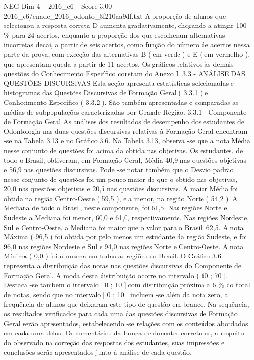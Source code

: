 \begin{textsample}{NEG Dim 4 – 2016\_c6 – Score 3.00 – 2016\_c6/enade\_2016\_odonto\_8f210aa9df.txt}
A proporção de alunos que selecionou a resposta correta D aumenta gradativamente, chegando a atingir 100 \% para 24 acertos, enquanto a proporção dos que escolheram alternativas incorretas decai, a partir de seis acertos, como função do número de acertos nessa parte da prova, com exceção das alternativas B ( em verde ) e E ( em vermelho ), que apresentam queda a partir de 11 acertos.
Os gráficos relativos às demais questões do Conhecimento Específico constam do Anexo I. 3.3 - ANÁLISE DAS QUESTÕES DISCURSIVAS Esta seção apresenta estatísticas selecionadas e histogramas das Questões Discursivas de Formação Geral ( 3.3.1 ) e Conhecimento Específico ( 3.3.2 ).
São também apresentadas e comparadas as médias de subpopulações caracterizadas por Grande Região. 3.3.1 - Componente de Formação Geral As análises dos resultados de desempenho dos estudantes de Odontologia nas duas questões discursivas relativas à Formação Geral encontram -se na Tabela 3.13 e no Gráfico 3.6.
Na Tabela 3.13, observa -se que a nota Média nesse conjunto de questões foi acima da obtida nas objetivas.
Os estudantes, de todo o Brasil, obtiveram, em Formação Geral, Média 40,9 nas questões objetivas e 56,9 nas questões discursivas.
Pode -se notar também que o Desvio padrão nesse conjunto de questões foi um pouco maior do que o obtido nas objetivas, 20,0 nas questões objetivas e 20,5 nas questões discursivas.
A maior Média foi obtida na região Centro-Oeste ( 59,5 ), e a menor, na região Norte ( 54,2 ).
A Mediana de todo o Brasil, neste componente, foi 61,5.
Nas regiões Norte e Sudeste a Mediana foi menor, 60,0 e 61,0, respectivamente.
Nas regiões Nordeste, Sul e Centro-Oeste, a Mediana foi maior que o valor para o Brasil, 62,5.
A nota Máxima ( 96,5 ) foi obtida por pelo menos um estudante da região Sudeste, e foi 96,0 nas regiões Nordeste e Sul e 94,0 nas regiões Norte e Centro-Oeste.
A nota Mínima ( 0,0 ) foi a mesma em todas as regiões do Brasil.
O Gráfico 3.6 representa a distribuição das notas nas questões discursivas do Componente de Formação Geral.
A moda desta distribuição ocorre no intervalo ( 60 ; 70 ].
Destaca -se também o intervalo [ 0 ; 10 ] com distribuição próxima a 6 \% do total de notas, sendo que no intervalo [ 0 ; 10 ] incluem -se além da nota zero, a frequência de alunos que deixaram este tipo de questão em branco.
Na sequência, os resultados verificados para cada uma das questões discursivas de Formação Geral serão apresentados, estabelecendo -se relações com os conteúdos abordados em cada uma delas.
Os comentários da Banca de docentes corretores, a respeito do observado na correção das respostas dos estudantes, suas impressões e conclusões serão apresentados junto à análise de cada questão.

\end{textsample}
